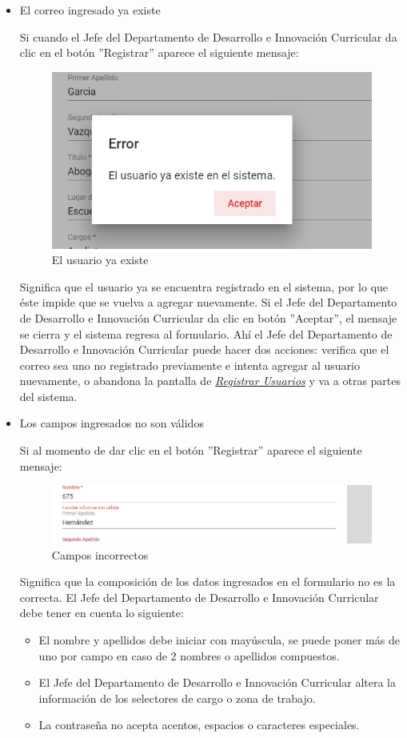 \begin{itemize}
	\item El correo ingresado ya existe
	
	Si cuando el Jefe del Departamento de Desarrollo e Innovación Curricular da clic en el botón ''Registrar'' aparece el siguiente mensaje:
	
	\begin{figure}[H]
		\centering
		\includegraphics[width=0.4\linewidth]{images/SP5/MSG36}
		\caption{El usuario ya existe}
		\label{mensaje36-JDDIC}
		
	\end{figure}
	
	Significa que el usuario ya se encuentra registrado en el sistema, por lo que éste impide que se vuelva a agregar nuevamente. Si el Jefe del Departamento de Desarrollo e Innovación Curricular da clic en botón ''Aceptar'', el mensaje se cierra y el sistema regresa al formulario. Ahí el Jefe del Departamento de Desarrollo e Innovación Curricular  puede hacer dos acciones: verifica que el correo sea uno no registrado previamente e intenta agregar al usuario nuevamente, o abandona la pantalla de \hyperlink{registrarUs-JDDIC}{\textit{Registrar Usuarios}} y va a otras partes del sistema.
	
	\item Los campos ingresados no son válidos
	
	Si al momento de dar clic en el botón ''Registrar'' aparece el siguiente mensaje:
	\begin{figure}[H]
		\centering
		\includegraphics[width=0.4\linewidth]{images/SP5/MSG35}
		\caption{Campos incorrectos}
		\label{mensaje35-JDDIC}
		
	\end{figure}
	
	Significa que la composición de los datos ingresados en el formulario no es la correcta. El Jefe del Departamento de Desarrollo e Innovación Curricular debe tener en cuenta lo siguiente:
	
	\begin{itemize}
		\item El nombre y apellidos debe iniciar con mayúscula, se puede poner más de uno por campo en caso de 2 nombres o apellidos compuestos.
		\item El Jefe del Departamento de Desarrollo e Innovación Curricular altera la información de los selectores de cargo o zona de trabajo.
		\item La contraseña no acepta acentos, espacios o caracteres especiales.
	\end{itemize}
	
\end{itemize}

